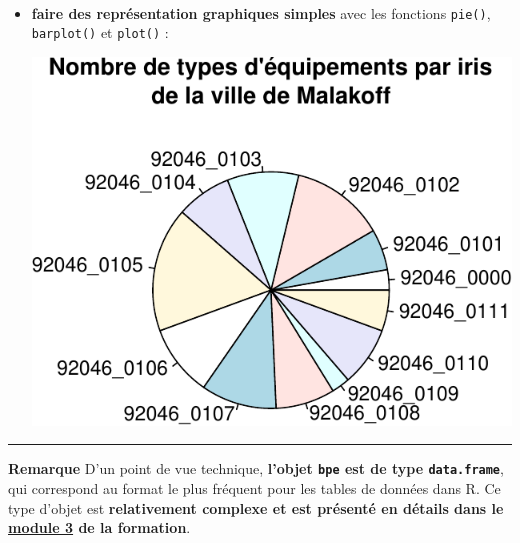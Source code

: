 \documentclass[12pt,twosided, notitlepage]{book}
\newenvironment{Shaded}{}{}
\newcommand{\KeywordTok}[1]{\textcolor[rgb]{0.00,0.00,1.00}{#1}}
\newcommand{\DataTypeTok}[1]{#1}
\newcommand{\CharTok}[1]{\textcolor[rgb]{0.00,0.50,0.50}{#1}}
\newcommand{\StringTok}[1]{\textcolor[rgb]{0.00,0.50,0.50}{#1}}
\newcommand{\CommentTok}[1]{\textcolor[rgb]{0.00,0.50,0.00}{#1}}
\newcommand{\OperatorTok}[1]{#1}
\newcommand{\NormalTok}[1]{#1}
\renewenvironment{Shaded}{\begin{snugshade}}{\end{snugshade}}
\begin{document}
~

\begin{itemize}
\item
  \textbf{faire des représentation graphiques simples} avec les
  fonctions \texttt{pie()},
  \texttt{barplot()} et
  \texttt{plot()} :

\begin{Shaded}
\end{Shaded}

  \begin{center}\includegraphics{livret_files/figure-latex/bpe_pie-1} \end{center}
\end{itemize}

\begin{center}\rule{0.5\linewidth}{\linethickness}\end{center}

\textbf{Remarque} D'un point de vue technique, \textbf{l'objet
\texttt{bpe} est de type \texttt{data.frame}}, qui correspond au format
le plus fréquent pour les tables de données dans R. Ce type d'objet est
\textbf{relativement complexe et est présenté en détails dans le
\underline{module 3} de la formation}.
\end{document}
